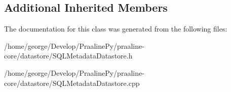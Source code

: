 \subsection*{Additional Inherited Members}


The documentation for this class was generated from the following files\+:\begin{DoxyCompactItemize}
\item 
/home/george/\+Develop/\+Praaline\+Py/praaline-\/core/datastore/S\+Q\+L\+Metadata\+Datastore.\+h\item 
/home/george/\+Develop/\+Praaline\+Py/praaline-\/core/datastore/S\+Q\+L\+Metadata\+Datastore.\+cpp\end{DoxyCompactItemize}
